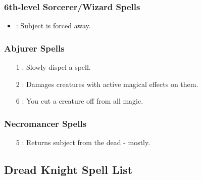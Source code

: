 \subsubsection{6th-level Sorcerer/Wizard Spells}
\begin{itemize}
 \item {}: Subject is forced away.
\end{itemize}

\subsubsection{Abjurer Spells}
\begin{itemize}
 \item[1] : Slowly dispel a spell.
 \item[2] : Damages creatures with active magical effects on them.
 \item[6] : You cut a creature off from all magic.
\end{itemize}

\subsubsection{Necromancer Spells}
\begin{itemize}
 \item[5] : Returns subject from the dead - mostly.
\end{itemize}

\subsection{Dread Knight Spell List}
